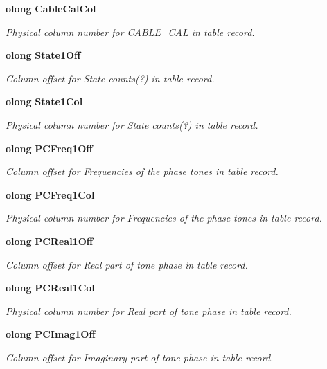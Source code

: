 \begin{CompactItemize}
{\bf olong} {\bf Cable\-Cal\-Col}
\begin{CompactList}\small\item\em Physical column number for CABLE\_\-CAL in table record. \item\end{CompactList}\item 
{\bf olong} {\bf State1Off}
\begin{CompactList}\small\item\em Column offset for State counts(?) in table record. \item\end{CompactList}\item 
{\bf olong} {\bf State1Col}
\begin{CompactList}\small\item\em Physical column number for State counts(?) in table record. \item\end{CompactList}\item 
{\bf olong} {\bf PCFreq1Off}
\begin{CompactList}\small\item\em Column offset for Frequencies of the phase tones in table record. \item\end{CompactList}\item 
{\bf olong} {\bf PCFreq1Col}
\begin{CompactList}\small\item\em Physical column number for Frequencies of the phase tones in table record. \item\end{CompactList}\item 
{\bf olong} {\bf PCReal1Off}
\begin{CompactList}\small\item\em Column offset for Real part of tone phase in table record. \item\end{CompactList}\item 
{\bf olong} {\bf PCReal1Col}
\begin{CompactList}\small\item\em Physical column number for Real part of tone phase in table record. \item\end{CompactList}\item 
{\bf olong} {\bf PCImag1Off}
\begin{CompactList}\small\item\em Column offset for Imaginary part of tone phase in table record. \item\end{CompactList}\item 

\end{CompactItemize}
